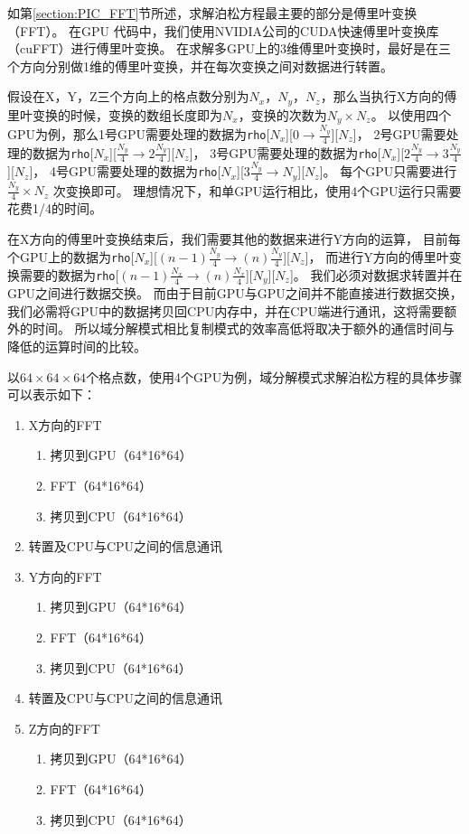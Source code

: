 如第\ref{section:PIC_FFT}节所述，求解泊松方程最主要的部分是傅里叶变换（FFT）。
在GPU 代码中，我们使用NVIDIA公司的CUDA快速傅里叶变换库（cuFFT）\cite{nvidia2010cufft}进行傅里叶变换。
在求解多GPU上的3维傅里叶变换时，最好是在三个方向分别做1维的傅里叶变换，并在每次变换之间对数据进行转置。

假设在X，Y，Z三个方向上的格点数分别为$N_x$，$N_y$，$N_z$，那么当执行X方向的傅里叶变换的时候，变换的数组长度即为$N_x$，变换的次数为$N_y \times N_z$。
以使用四个GPU为例，那么1号GPU需要处理的数据为\verb'rho'[$N_x$][$0 \rightarrow \frac{N_y}{4}$][$N_z$]，
2号GPU需要处理的数据为\verb'rho'[$N_x$][$\frac{N_y}{4} \rightarrow 2\frac{N_y}{4}$][$N_z$]，
3号GPU需要处理的数据为\verb'rho'[$N_x$][$2\frac{N_y}{4}\rightarrow 3\frac{N_y}{4}$][$N_z$]，
4号GPU需要处理的数据为\verb'rho'[$N_x$][$3\frac{N_y}{4}\rightarrow N_y$][$N_z$]。
每个GPU只需要进行$\frac{N_y}{4} \times N_z$ 次变换即可。
理想情况下，和单GPU运行相比，使用4个GPU运行只需要花费1/4的时间。

在X方向的傅里叶变换结束后，我们需要其他的数据来进行Y方向的运算，
目前每个GPU上的数据为\verb'rho'[$N_x$][$(n-1)\frac{N_y}{4}\rightarrow (n)\frac{N_y}{4}$][$N_z$]，
而进行Y方向的傅里叶变换需要的数据为\verb'rho'[$(n-1)\frac{N_x}{4}\rightarrow (n)\frac{N_x}{4}$][$N_y$][$N_z$]。
我们必须对数据求转置并在GPU之间进行数据交换。
而由于目前GPU与GPU之间并不能直接进行数据交换，我们必需将GPU中的数据拷贝回CPU内存中，并在CPU端进行通讯，这将需要额外的时间。
所以域分解模式相比复制模式的效率高低将取决于额外的通信时间与降低的运算时间的比较。

以$64 \times 64 \times 64$个格点数，使用4个GPU为例，域分解模式求解泊松方程的具体步骤可以表示如下：
\begin{enumerate}
  \item X方向的FFT
  \begin{enumerate}
    \item 拷贝到GPU（64*16*64）
    \item FFT（64*16*64）
    \item 拷贝到CPU（64*16*64）
  \end{enumerate}
  \item 转置及CPU与CPU之间的信息通讯
  \item Y方向的FFT
  \begin{enumerate}
    \item 拷贝到GPU（64*16*64）
    \item FFT（64*16*64）
    \item 拷贝到CPU（64*16*64）
  \end{enumerate}
  \item 转置及CPU与CPU之间的信息通讯
  \item Z方向的FFT
  \begin{enumerate}
    \item 拷贝到GPU（64*16*64）
    \item FFT（64*16*64）
    \item 拷贝到CPU（64*16*64）
  \end{enumerate}
\end{enumerate}

